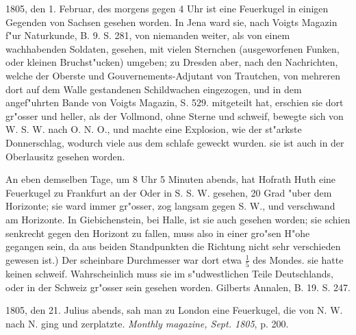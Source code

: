 \documentclass[a4paper, 11pt, oneside, polutonikogreek, german]{article}
\begin{document}
1805, den 1. Februar, des morgens gegen 4 Uhr ist eine Feuerkugel in einigen Gegenden von Sachsen gesehen worden. In Jena ward sie, nach Voigts Magazin f"ur Naturkunde, B. 9. S. 281, von niemanden weiter, als von einem wachhabenden Soldaten, gesehen, mit vielen Sternchen (ausgeworfenen Funken, oder kleinen Bruchst"ucken) umgeben; zu Dresden aber, nach den Nachrichten, welche der Oberste und Gouvernements-Adjutant von Trautchen, von mehreren dort auf dem Walle gestandenen Schildwachen eingezogen, und in dem angef"uhrten Bande von Voigts Magazin, S. 529. mitgeteilt hat, erschien sie dort gr"osser und heller, als der Vollmond, ohne Sterne und schweif, bewegte sich von W. S. W. nach O. N. O., und machte eine Explosion, wie der st"arkste Donnerschlag, wodurch viele aus dem schlafe geweckt wurden. sie ist auch in der Oberlausitz gesehen worden.

An eben demselben Tage, um 8 Uhr 5 Minuten abends, hat Hofrath Huth eine Feuerkugel zu Frankfurt an der Oder in S. S. W. gesehen, 20 Grad "uber dem Horizonte; sie ward immer gr"osser, zog langsam gegen S. W., und verschwand am Horizonte. In Giebichenstein, bei Halle, ist sie auch gesehen worden; sie schien senkrecht gegen den Horizont zu fallen, muss also in einer gro"sen H"ohe gegangen sein, da aus beiden Standpunkten die Richtung nicht sehr verschieden gewesen ist.) Der scheinbare Durchmesser war dort etwa $\mathfrak{\frac{1}{5}}$ des Mondes. sie hatte keinen schweif. Wahrscheinlich muss sie im s"udwestlichen Teile Deutschlands, oder in der Schweiz gr"osser sein gesehen worden. Gilberts Annalen, B. 19. S. 247.

1805, den 21. Julius abends, sah man zu London eine Feuerkugel, die von N. W. nach N. ging und zerplatzte. \emph{Monthly magazine, Sept. 1805}, p. 200.
\end{document}
